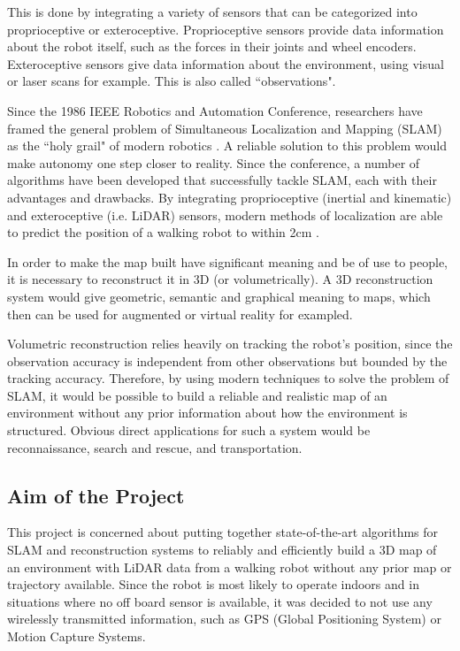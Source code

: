 \documentclass[12pt]{article}
\begin{document}
This is done by integrating a variety of sensors that can be categorized into proprioceptive or exteroceptive. Proprioceptive sensors provide data information about the robot itself, such as the forces in their joints and wheel encoders. Exteroceptive sensors give data information about the environment, using visual or laser scans for example. This is also called ``observations".
	
Since the 1986 IEEE Robotics and Automation Conference, researchers have framed the general problem of Simultaneous Localization and Mapping (SLAM) as the ``holy grail" of modern robotics \cite{SLAMPartI}. A reliable solution to this problem would make autonomy one step closer to reality. Since the conference, a number of algorithms have been developed that successfully tackle SLAM, each with their advantages and drawbacks. By integrating proprioceptive (inertial and kinematic) and exteroceptive (i.e. LiDAR) sensors, modern methods of localization are able to predict the position of a walking robot to within 2cm \cite{7041346}.
	
In order to make the map built have significant meaning and be of use to people, it is necessary to reconstruct it in 3D (or volumetrically). A 3D reconstruction system would give geometric, semantic and graphical meaning to maps, which then can be used for augmented or virtual reality for exampled.
	
Volumetric reconstruction relies heavily on tracking the robot's position, since the observation accuracy is independent from other observations but bounded by the tracking accuracy. Therefore, by using modern techniques to solve the problem of SLAM, it would be possible to build a reliable and realistic map of an environment without any prior information about how the environment is structured. Obvious direct applications for such a system would be reconnaissance, search and rescue, and transportation.
	
	\subsection{Aim of the Project}

This project is concerned about putting together state-of-the-art algorithms for SLAM and reconstruction systems to reliably and efficiently build a 3D map of an environment with LiDAR data from a walking robot without any prior map or trajectory available. Since the robot is most likely to operate indoors and in situations where no off board sensor is available, it was decided to not use any wirelessly transmitted information, such as GPS (Global Positioning System) or Motion Capture Systems.
	
\end{document}
